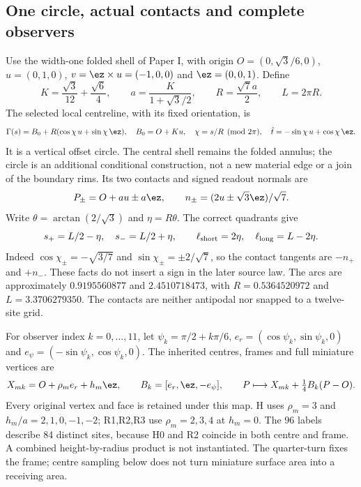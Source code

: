 \subsection{One circle, actual contacts and complete observers}
Use the width-one folded shell of Paper I, with origin $O=(0,\sqrt3/6,0)$, $u=(0,1,0)$, $v=\ez\times u=(-1,0,0)$ and $\ez=(0,0,1)$. Define
\begin{equation}\label{eq:geometry}
 K=\frac{\sqrt3}{12}+\frac{\sqrt6}{4},\qquad
 a=\frac{K}{1+\sqrt3/2},\qquad R=\frac{\sqrt7a}{2},\qquad L=2\pi R.
\end{equation}
The selected local centreline, with its fixed orientation, is
\begin{equation}\label{eq:circle}
 \Gamma(s)=B_0+R(\cos\chi\,u+\sin\chi\,\ez),\quad
 B_0=O+Ku,\quad \chi=s/R\pmod{2\pi},\quad
 \hat t=-\sin\chi\,u+\cos\chi\,\ez.
\end{equation}
It is a vertical offset circle. The central shell remains the folded annulus; the circle is an additional conditional construction, not a new material edge or a join of the boundary rims. Its two contacts and signed readout normals are
\begin{equation}\label{eq:contacts}
 P_\pm=O+au\pm a\ez,\qquad n_\pm=(2u\pm\sqrt3\ez)/\sqrt7.
\end{equation}
Write $\theta=\arctan(2/\sqrt3)$ and $\eta=R\theta$. The correct quadrants give
\begin{equation}\label{eq:arcs}
 s_+=L/2-\eta,\quad s_-=L/2+\eta,\qquad
 \ell_{\rm short}=2\eta,\quad\ell_{\rm long}=L-2\eta.
\end{equation}
Indeed $\cos\chi_\pm=-\sqrt{3/7}$ and $\sin\chi_\pm=\pm2/\sqrt7$, so the contact tangents are $-n_+$ and $+n_-$. These facts do not insert a sign in the later source law. The arcs are approximately $0.9195560877$ and $2.4510718473$, with $R=0.5364520972$ and $L=3.3706279350$. The contacts are neither antipodal nor snapped to a twelve-site grid.

For observer index $k=0,\ldots,11$, let $\psi_k=\pi/2+k\pi/6$, $e_r=(\cos\psi_k,\sin\psi_k,0)$ and $e_\psi=(-\sin\psi_k,\cos\psi_k,0)$. The inherited centres, frames and full miniature vertices are
\begin{equation}\label{eq:observers}
 X_{mk}=O+\rho_m e_r+h_m\ez,\qquad B_k=[e_r,\ez,-e_\psi],\qquad
 P\longmapsto X_{mk}+\tfrac14 B_k(P-O).
\end{equation}
Every original vertex and face is retained under this map. H uses $\rho_m=3$ and $h_m/a=2,1,0,-1,-2$; R1,R2,R3 use $\rho_m=2,3,4$ at $h_m=0$. The 96 labels describe 84 distinct sites, because H0 and R2 coincide in both centre and frame. A combined height-by-radius product is not instantiated. The quarter-turn fixes the frame; centre sampling below does not turn miniature surface area into a receiving area.

